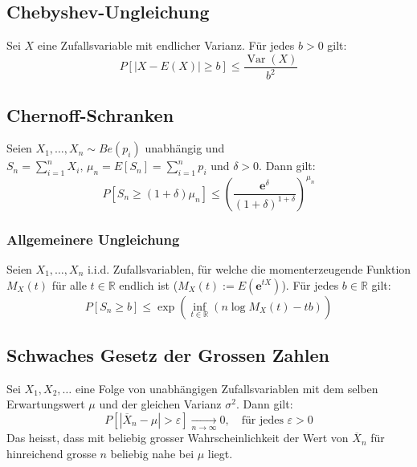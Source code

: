 \documentclass[a4paper,titlepage]{article}
\DeclareMathOperator{\Var}{Var}
\newcommand{\emath}{\boldsymbol{e}}
\newcommand{\abs}[1]{\left\vert #1 \right\vert}
\begin{document}
\subsection{Chebyshev-Ungleichung}
Sei $X$ eine Zufallsvariable mit endlicher Varianz. Für jedes $b > 0$ gilt:
\begin{equation*}
P[\abs{X-E(X)} \geq b] \leq \frac{\Var(X)}{b^2}
\end{equation*}

\subsection{Chernoff-Schranken}
Seien $X_1, \dots, X_n \sim Be(p_i)$ unabhängig und $S_n = \sum\limits_{i=1}^{n}X_i, \, \mu_n = E[S_n] = \sum\limits_{i=1}^{n}p_i$ und $\delta > 0$. Dann gilt:
\begin{equation*}
P[S_n \geq (1 + \delta) \mu_n] \leq \left( \frac{\emath^\delta}{\left( 1 + \delta \right)^{1+ \delta}}\right)^{\mu_n}
\end{equation*}

\subsubsection{Allgemeinere Ungleichung}
Seien $X_1, \dots, X_n$ i.i.d. Zufallsvariablen, für welche die momenterzeugende Funktion $M_X(t)$ für alle $t \in \mathbb{R}$ endlich ist ($M_X(t) := E(\emath^{tX})$). Für jedes $b \in \mathbb{R}$ gilt:
\begin{equation*}
P[S_n \geq b] \leq \exp\left( \inf\limits_{t \in \mathbb{R}} \left( n \log M_X(t) -tb \right) \right)
\end{equation*}

\subsection{Schwaches Gesetz der Grossen Zahlen}
Sei $X_1, X_2, \dots$ eine Folge von unabhängigen Zufallsvariablen mit dem selben Erwartungswert $\mu$ und der gleichen Varianz $\sigma^2$. Dann gilt:
\begin{equation*}
P \left[ \abs{ \overline{X}_n - \mu } > \varepsilon \right] \xrightarrow[n \to \infty]{ } 0, \quad \text{für jedes $\varepsilon > 0$}
\end{equation*}
Das heisst, dass mit beliebig grosser Wahrscheinlichkeit der Wert von $\overline{X}_n$ für hinreichend grosse $n$ beliebig nahe bei $\mu$ liegt.
\end{document}
